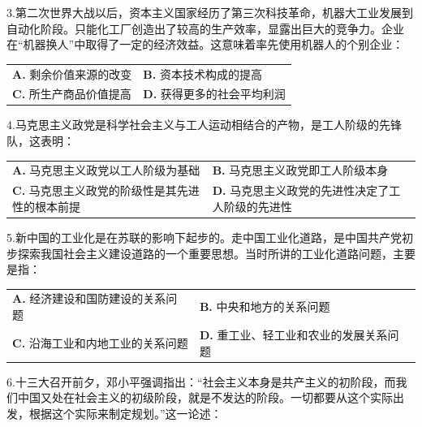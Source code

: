 \documentclass[UTF8,11pt]{ctexart}
\begin{document}
3.第二次世界大战以后，资本主义国家经历了第三次科技革命，机器大工业发展到自动化阶段。只能化工厂创造出了较高的生产效率，显露出巨大的竞争力。企业在“机器换人”中取得了一定的经济效益。这意味着率先使用机器人的个别企业：


\begin{center}\begin{tabular}{>{\raggedright\arraybackslash}p{\dimexpr(\linewidth-4\tabcolsep)/2\relax}>{\raggedright\arraybackslash}p{\dimexpr(\linewidth-4\tabcolsep)/2\relax}}
\textbf{A.} 剩余价值来源的改变 & \textbf{B.} 资本技术构成的提高\\[.35em]
\textbf{C.} 所生产商品价值提高 & \textbf{D.} 获得更多的社会平均利润\\[.35em]\end{tabular}\end{center}

4.马克思主义政党是科学社会主义与工人运动相结合的产物，是工人阶级的先锋队，这表明：


\begin{center}\begin{tabular}{>{\raggedright\arraybackslash}p{\dimexpr(\linewidth-4\tabcolsep)/2\relax}>{\raggedright\arraybackslash}p{\dimexpr(\linewidth-4\tabcolsep)/2\relax}}
\textbf{A.} 马克思主义政党以工人阶级为基础 & \textbf{B.} 马克思主义政党即工人阶级本身\\[.35em]
\textbf{C.} 马克思主义政党的阶级性是其先进性的根本前提 & \textbf{D.} 马克思主义政党的先进性决定了工人阶级的先进性\\[.35em]\end{tabular}\end{center}

5.新中国的工业化是在苏联的影响下起步的。走中国工业化道路，是中国共产党初步探索我国社会主义建设道路的一个重要思想。当时所讲的工业化道路问题，主要是指：


\begin{center}\begin{tabular}{>{\raggedright\arraybackslash}p{\dimexpr(\linewidth-4\tabcolsep)/2\relax}>{\raggedright\arraybackslash}p{\dimexpr(\linewidth-4\tabcolsep)/2\relax}}
\textbf{A.} 经济建设和国防建设的关系问题 & \textbf{B.} 中央和地方的关系问题\\[.35em]
\textbf{C.} 沿海工业和内地工业的关系问题 & \textbf{D.} 重工业、轻工业和农业的发展关系问题\\[.35em]\end{tabular}\end{center}

6.十三大召开前夕，邓小平强调指出：“社会主义本身是共产主义的初阶段，而我们中国又处在社会主义的初级阶段，就是不发达的阶段。一切都要从这个实际出发，根据这个实际来制定规划。”这一论述：
\end{document}
